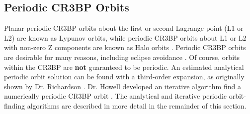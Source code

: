 \documentclass[conf]{new-aiaa}
\begin{document}
\begin{multicols*}{2}

\subsection{Periodic CR3BP Orbits}

Planar periodic CR3BP orbits about the first or second Lagrange point
(L1 or L2) are known as Lypunov orbits, while periodic CR3BP orbits
about L1 or L2 with non-zero Z components are known as Halo orbits 
\cite{koon2008dynamical}.
Periodic CR3BP orbits are desirable for many reasons, including
eclipse avoidance 
\cite{williams2017targeting}.
Of course, orbits within the CR3BP are \textbf{not} guaranteed to be
periodic. An estimated analytical periodic orbit solution can be found 
with a third-order expansion, as originally shown by Dr. Richardson
\cite{richardson1980analytical}
\cite{koon2008dynamical}
\cite{rund2018interplanetary}. 
Dr. Howell developed an iterative algorithm find a numerically 
periodic CR3BP orbit
\cite{howell1984three} 
\cite{koon2008dynamical} 
\cite{rund2018interplanetary}.
The analytical and iterative periodic orbit-finding algorithms 
are described in more detail in the remainder of this section.


\end{multicols*}
\end{document}
